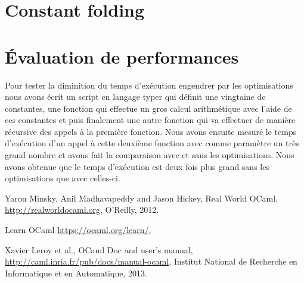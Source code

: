 \documentclass{article}
\begin{document}
\section{Constant folding}

\section{Évaluation de performances}

Pour tester la diminition du temps d'exécution engendrer par les optimisations
nous avons écrit un script en langage typer qui définit une vingtaine de
constantes, une fonction qui effectue un gros calcul arithmétique avec l'aide
de ces constantes et puis finalement une autre fonction qui va effectuer de
manière récursive des appels à la première fonction. Nous avons ensuite 
mesuré le temps d'exécution d'un appel à cette deuxième fonction avec comme
paramètre un très grand nombre et avons fait la comparaison avec et sans les
optimisations. Nous avons obtenue que le temps d'exécution est deux fois plus
grand sans les optimisations que avec celles-ci.

\begin{thebibliography}{9}

	Yaron Minsky, Anil Madhavapeddy and Jason Hickey,
	Real World OCaml,
	\url{http://realworldocaml.org},
	O'Reilly,
	2012.

	Learn OCaml
	\url{https://ocaml.org/learn/},

	Xavier Leroy et al.,
	OCaml Doc and user's manual,
	\url{http://caml.inria.fr/pub/docs/manual-ocaml},
	Institut National de Recherche en Informatique et en Automatique,
	2013.

\end{thebibliography}
\end{document}
